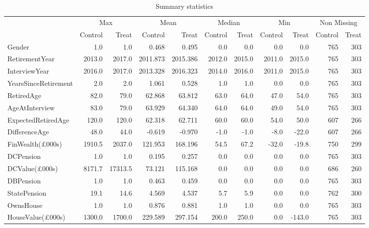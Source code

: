 \begin{table}

\caption{Summary statistics \label{tab:sum_stats} }
\centering
\fontsize{10}{12}\selectfont
\begin{tabular}[t]{lrrrrrrrrrr}
\toprule
\multicolumn{1}{c}{ } & \multicolumn{2}{c}{Max} & \multicolumn{2}{c}{Mean} & \multicolumn{2}{c}{Median} & \multicolumn{2}{c}{Min} & \multicolumn{2}{c}{Non Missing} \\
\cmidrule(l{3pt}r{3pt}){2-3} \cmidrule(l{3pt}r{3pt}){4-5} \cmidrule(l{3pt}r{3pt}){6-7} \cmidrule(l{3pt}r{3pt}){8-9} \cmidrule(l{3pt}r{3pt}){10-11}
 & Control & Treat & Control & Treat & Control & Treat & Control & Treat & Control & Treat\\
\midrule
Gender & 1.0 & 1.0 & 0.468 & 0.495 & 0.0 & 0.0 & 0.0 & 0.0 & 765 & 303\\
RetirementYear & 2013.0 & 2017.0 & 2011.873 & 2015.386 & 2012.0 & 2015.0 & 2011.0 & 2015.0 & 765 & 303\\
InterviewYear & 2016.0 & 2017.0 & 2013.328 & 2016.323 & 2014.0 & 2016.0 & 2011.0 & 2015.0 & 765 & 303\\
YearsSinceRetirement & 2.0 & 2.0 & 1.061 & 0.528 & 1.0 & 1.0 & 0.0 & 0.0 & 765 & 303\\
RetiredAge & 82.0 & 79.0 & 62.868 & 63.812 & 63.0 & 64.0 & 47.0 & 54.0 & 765 & 303\\
\addlinespace
AgeAtInterview & 83.0 & 79.0 & 63.929 & 64.340 & 64.0 & 64.0 & 49.0 & 54.0 & 765 & 303\\
ExpectedRetiredAge & 120.0 & 120.0 & 62.318 & 62.711 & 60.0 & 60.0 & 54.0 & 50.0 & 607 & 266\\
DifferenceAge & 48.0 & 44.0 & -0.619 & -0.970 & -1.0 & -1.0 & -8.0 & -22.0 & 607 & 266\\
FinWealth(£000s) & 1910.5 & 2037.0 & 121.953 & 168.196 & 54.5 & 67.2 & -32.0 & -19.8 & 750 & 299\\
DCPension & 1.0 & 1.0 & 0.195 & 0.257 & 0.0 & 0.0 & 0.0 & 0.0 & 765 & 303\\
\addlinespace
DCValue(£000s) & 8171.7 & 17313.5 & 73.121 & 115.168 & 0.0 & 0.0 & 0.0 & 0.0 & 686 & 260\\
DBPension & 1.0 & 1.0 & 0.463 & 0.459 & 0.0 & 0.0 & 0.0 & 0.0 & 765 & 303\\
StatePension & 19.1 & 14.6 & 4.569 & 4.537 & 5.7 & 5.9 & 0.0 & 0.0 & 762 & 300\\
OwnsHouse & 1.0 & 1.0 & 0.876 & 0.881 & 1.0 & 1.0 & 0.0 & 0.0 & 765 & 303\\
HouseValue(£000s) & 1300.0 & 1700.0 & 229.589 & 297.154 & 200.0 & 250.0 & 0.0 & -143.0 & 765 & 303\\

\end{tabular}
\end{table}
